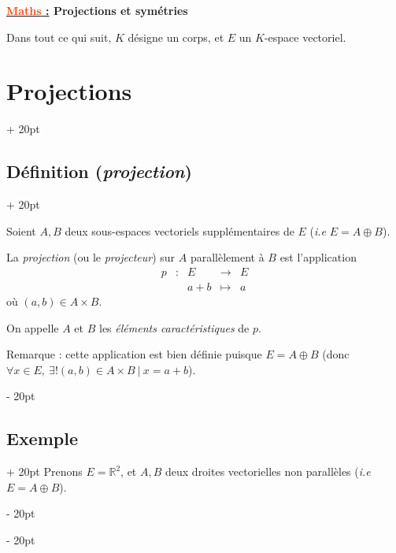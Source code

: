 \documentclass[a4paper, 12pt, twoside]{article}
\renewcommand{\emph}{\textcolor{ff4500}}
\newcommand{\R}{\mathbb{R}} %
\newcommand{\ind}[1][20pt]{\advance\leftskip + #1}
\newcommand{\deind}[1][20pt]{\advance\leftskip - #1}
\newenvironment{indt}[2][20pt]{#2 \par \ind[#1]}{\par \deind} %
\newcommand{\thetitle}[2]{\begin{center}\textbf{{\LARGE \underline{\emph{#1} :}} {\Large #2}}\end{center}}
\begin{document}
    
    
    \thetitle{Maths}{Projections et symétries}
    
    \tableofcontents
    \newpage
    
    
    Dans tout ce qui suit, $K$ désigne un corps, et $E$ un $K$-espace vectoriel.


    \begin{indt}{\section{Projections}}
        
        \begin{indt}{\subsection{Définition (\textit{projection})}}
            \label{1.1}

            Soient $A, B$ deux sous-espaces vectoriels supplémentaires de $E$ (\textit{i.e} $E = A \oplus B$).

            La \textit{projection} (ou le \textit{projecteur}) sur $A$ parallèlement à $B$ est l'application
            \[
                \begin{array}{ccccc}
                    p & : & E & \longrightarrow & E
                    \\
                    && a + b & \longmapsto & a
                \end{array}
            \]
            où $(a, b) \in A \times B$.

            On appelle $A$ et $B$ les \textit{éléments caractéristiques} de $p$.

            \vspace{12pt}
            
            Remarque :
            cette application est bien définie puisque $E = A \oplus B$ (donc $\forall x \in E,\ \exists! (a, b) \in A \times B\ |\ x = a + b$).
        \end{indt}

        \vspace{12pt}
        
        \begin{indt}{\subsection{Exemple}}
            Prenons $E = \R^2$, et $A, B$ deux droites vectorielles non parallèles (\textit{i.e} $E = A \oplus B$).


\end{indt}
\end{indt}
\end{document}
